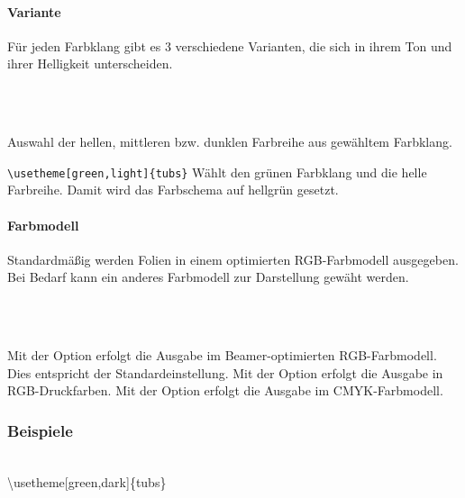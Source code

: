 \paragraph{Variante}
Für jeden Farbklang gibt es 3 verschiedene Varianten, die sich in ihrem Ton
und ihrer Helligkeit unterscheiden.

\begin{Declaration}
  \\
  \\
\end{Declaration}

Auswahl der hellen, mittleren bzw. dunklen Farbreihe aus gewähltem Farbklang.

\begin{example}
\lstinline!\usetheme[green,light]{tubs}! Wählt den grünen Farbklang und die
helle Farbreihe. Damit wird das Farbschema auf hellgrün gesetzt.
\end{example}

\paragraph{Farbmodell}
Standardmäßig werden Folien in einem optimierten RGB-Farbmodell ausgegeben.
Bei Bedarf kann ein anderes Farbmodell zur Darstellung gewäht werden.


\begin{Declaration}
  \\
  \\
\end{Declaration}

Mit der Option  erfolgt die Ausgabe im Beamer-optimierten RGB-Farbmodell.
Dies entspricht der Standardeinstellung.
Mit der Option  erfolgt die Ausgabe in RGB-Druckfarben.
Mit der Option  erfolgt die Ausgabe im CMYK-Farbmodell.

\clearpage
\subsubsection{Beispiele}

\begin{center}
\begin{minipage}{0.49\textwidth}
\end{minipage}\hfill
\begin{minipage}{0.49\textwidth}
\end{minipage}\medskip\\
{\ttfamily \textbackslash usetheme[green,dark]\{tubs\}}
\end{center}

